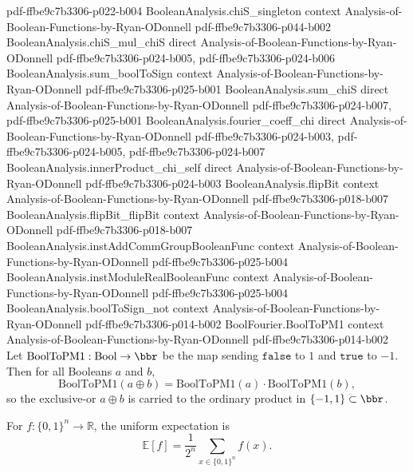 \begin{lemma}
  {pdf-ffbe9c7b3306-p022-b004}
\proofstep
  {BooleanAnalysis.chiS_singleton}
  {context}
  {Analysis-of-Boolean-Functions-by-Ryan-ODonnell}
  {pdf-ffbe9c7b3306-p044-b002}
\proofstep
  {BooleanAnalysis.chiS_mul_chiS}
  {direct}
  {Analysis-of-Boolean-Functions-by-Ryan-ODonnell}
  {pdf-ffbe9c7b3306-p024-b005,
    pdf-ffbe9c7b3306-p024-b006}
\proofstep
  {BooleanAnalysis.sum_boolToSign}
  {context}
  {Analysis-of-Boolean-Functions-by-Ryan-ODonnell}
  {pdf-ffbe9c7b3306-p025-b001}
\proofstep
  {BooleanAnalysis.sum_chiS}
  {direct}
  {Analysis-of-Boolean-Functions-by-Ryan-ODonnell}
  {pdf-ffbe9c7b3306-p024-b007,
    pdf-ffbe9c7b3306-p025-b001}
\proofstep
  {BooleanAnalysis.fourier_coeff_chi}
  {direct}
  {Analysis-of-Boolean-Functions-by-Ryan-ODonnell}
  {pdf-ffbe9c7b3306-p024-b003,
    pdf-ffbe9c7b3306-p024-b005,
    pdf-ffbe9c7b3306-p024-b007}
\proofstep
  {BooleanAnalysis.innerProduct_chi_self}
  {direct}
  {Analysis-of-Boolean-Functions-by-Ryan-ODonnell}
  {pdf-ffbe9c7b3306-p024-b003}
\proofstep
  {BooleanAnalysis.flipBit}
  {context}
  {Analysis-of-Boolean-Functions-by-Ryan-ODonnell}
  {pdf-ffbe9c7b3306-p018-b007}
\proofstep
  {BooleanAnalysis.flipBit_flipBit}
  {context}
  {Analysis-of-Boolean-Functions-by-Ryan-ODonnell}
  {pdf-ffbe9c7b3306-p018-b007}
\proofstep
  {BooleanAnalysis.instAddCommGroupBooleanFunc}
  {context}
  {Analysis-of-Boolean-Functions-by-Ryan-ODonnell}
  {pdf-ffbe9c7b3306-p025-b004}
\proofstep
  {BooleanAnalysis.instModuleRealBooleanFunc}
  {context}
  {Analysis-of-Boolean-Functions-by-Ryan-ODonnell}
  {pdf-ffbe9c7b3306-p025-b004}
\proofstep
  {BooleanAnalysis.boolToSign_not}
  {context}
  {Analysis-of-Boolean-Functions-by-Ryan-ODonnell}
  {pdf-ffbe9c7b3306-p014-b002}
\proofstep
  {BoolFourier.BoolToPM1}
  {context}
  {Analysis-of-Boolean-Functions-by-Ryan-ODonnell}
  {pdf-ffbe9c7b3306-p014-b002}
Let $\mathrm{BoolToPM1} : \mathrm{Bool} \to \bbr$ be the map sending $\mathtt{false}$ to
$1$ and $\mathtt{true}$ to $-1$. Then for all Booleans $a$ and $b$,
\[
  \mathrm{BoolToPM1}(a \oplus b) = \mathrm{BoolToPM1}(a)\cdot\mathrm{BoolToPM1}(b),
\]
so the exclusive-or $a \oplus b$ is carried to the ordinary product in
$\{-1,1\}\subset\bbr$.
\end{lemma}

\begin{definition}
\label{BoolFourier.expectation}
\leanok
{}
For $f : \{0,1\}^n \to \mathbb{R}$, the uniform expectation is
\[
  \mathbb{E}[f] = \frac{1}{2^n} \sum_{x \in \{0,1\}^n} f(x).
\]
\end{definition}

